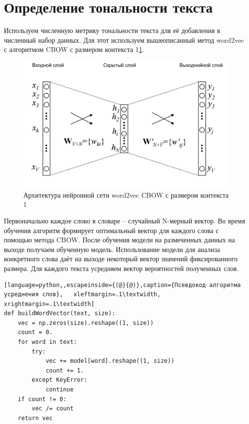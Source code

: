 \section{Определение тональности текста}
Используем численную метрику тональности текста для её добавления в численный набор данных. Для этот используем вышеописанный метод word2vec с алгоритмом CBOW с размером контекста 1\ref{fig09}.
\begin{figure}[!h]
	\centering
	\includegraphics[scale=0.4]{master_img/cbow_model2_edited.png}
	\caption{Архитектура нейронной сети word2vec CBOW с размером контекста 1}
	\label{fig09}
\end{figure}
 Первоначально каждое слово в словаре – случайный N-мерный вектор. Во время обучения алгоритм формирует оптимальный вектор для каждого слова с помощью метода CBOW. После обучения модели на размеченных данных на выходе получаем обученную модель. Использование модели для анализа конкретного слова даёт на выходе некоторый вектор значений фиксированного размера.
 Для каждого текста усредняем вектор вероятностей полученных слов.
 \begin{center}
 	
 \begin{lstlisting}[language=python,,escapeinside={(@}{@)},caption={Псевдокод алгоритма усреднения слов},   xleftmargin=.1\textwidth, xrightmargin=.1\textwidth] 
def buildWordVector(text, size):
	vec = np.zeros(size).reshape((1, size))
	count = 0.
	for word in text:
		try:
			vec += model[word].reshape((1, size))
			count += 1.
	 	except KeyError:
			continue
	if count != 0:
		vec /= count
	return vec

 \end{lstlisting}
 \end{center}

